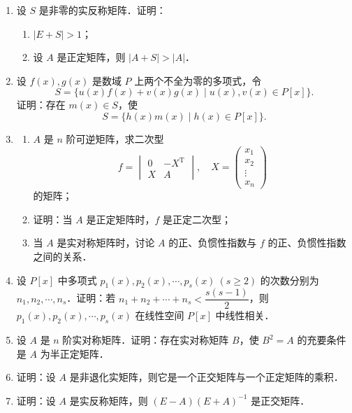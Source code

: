 \begin{enumerate}
  \ansproof
  \item 设 $S$ 是非零的实反称矩阵．证明：
  \begin{enumerate}
    \item $|E+S|>1$；
  \anssub
    \item 设 $A$ 是正定矩阵，则 $|A+S|>|A|$．
  \anssub
  \end{enumerate}

  \item 设 $f(x),g(x)$ 是数域 $P$ 上两个不全为零的多项式，令
  \[
    S=\{u(x)f(x)+v(x)g(x)\mid u(x),v(x)\in P[x]\}.
  \]
  证明：存在 $m(x)\in S$，使
  \[
    S=\{h(x)m(x)\mid h(x)\in P[x]\}.
  \]

  \ansproof
  \item
  \begin{enumerate}
    \item $A$ 是 $n$ 阶可逆矩阵，求二次型
    \[
      f=\begin{vmatrix}
        0 & -X^{\mathrm{T}}\\
        X & A
      \end{vmatrix},
      \quad
      X=\begin{pmatrix}
        x_1\\
        x_2\\
        \vdots\\
        x_n
      \end{pmatrix}
    \]
    的矩阵；
  \anssub
    \item 证明：当 $A$ 是正定矩阵时，$f$ 是正定二次型；
  \anssub
    \item 当 $A$ 是实对称矩阵时，讨论 $A$ 的正、负惯性指数与 $f$ 的正、负惯性指数之间的关系．
  \anssub
  \end{enumerate}

  \item 设 $P[x]$ 中多项式 $p_1(x),p_2(x),\cdots,p_s(x)\ (s\geq 2)$ 的次数分别为 $n_1,n_2,\cdots,n_s$．证明：若 $n_1+n_2+\cdots+n_s<\dfrac{s(s-1)}{2}$，则 $p_1(x),p_2(x),\cdots,p_s(x)$ 在线性空间 $P[x]$ 中线性相关．

  \ansproof
  \item 设 $A$ 是 $n$ 阶实对称矩阵．证明：存在实对称矩阵 $B$，使 $B^2=A$ 的充要条件是 $A$ 为半正定矩阵．

  \ansproof
  \item 证明：设 $A$ 是非退化实矩阵，则它是一个正交矩阵与一个正定矩阵的乘积．

  \ansproof
  \item 证明：设 $A$ 是实反称矩阵，则 $(E-A)(E+A)^{-1}$ 是正交矩阵．


\end{enumerate}
